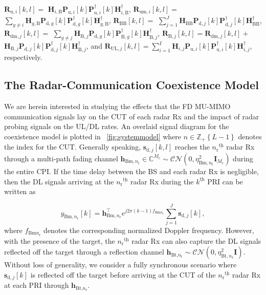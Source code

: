 \documentclass[9pt,journal]{IEEEtran}
\newcommand{\paren}[1]{\left({#1}\right)}
\newcommand{\bracket}[1]{{\left [{#1}\right ]}}
\newcommand{\braces}[1]{{\left\{ {#1}\right\}}}
\newcommand{\ith}[1]    {{#1}^{\underline{\text{th}}}}
\newcommand{\rr}{_\mathrm{r}}
\newcommand{\B}{\textrm{B}}
\newcommand{\PiB}{\mathbf{P}_{\textrm{u},i}\bracket{k}}
\newcommand{\PiBH}{\mathbf{P}^\dagger_{\textrm{u},i}\bracket{k}}
\newcommand{\PBj}{\mathbf{P}_{\textrm{d},j}\bracket{k}}
\newcommand{\PBjH}{\mathbf{P}^\dagger_{\textrm{d},j}\bracket{k}}
\newcommand{\PBg}{\mathbf{P}_{\textrm{d},g}\bracket{k}}
\newcommand{\PBgH}{\mathbf{P}^\dagger_{\textrm{d},g}\bracket{k}}
\newcommand{\HiB}{\mathbf{H}_{i,\textrm{B}}}
\newcommand{\HiBH}{\mathbf{H}^\dagger_{i,\textrm{B}}}
\begin{document}
$\mathbf{R}_{\textrm{u},i}\bracket{k,l}=$ $\HiB\PiB\PiBH\HiBH$,  $\mathbf{R}_{\textrm{um},i}\bracket{k,l}=$ $\sum_{g\neq i }\mathbf{H}_{g,\textrm{B}}\PBg\PBgH\mathbf{H}^\dagger_{g,\textrm{B}}$, $\mathbf{R}_{\mathrm{BB}}\bracket{k,l}=$ $\sum_{j=1}^{\mathit{J}}\mathbf{H}_{\mathrm{BB}}\PBj\PBjH\mathbf{H}^\dagger_\mathrm{BB}$, $\mathbf{R}_{\textrm{dm},j}\bracket{k,l}=$ $\sum_{g\neq j}\mathbf{H}_{\textrm{B},j}\PBg\mathbf{P}^{\dagger}_{\textrm{B},g}\bracket{k}\mathbf{H}^\dagger_{\textrm{B},j}$, $\mathbf{R}_{\B,j}\bracket{k,l}=\mathbf{R}_{\textrm{dm},j}\bracket{k,l}+$ $\mathbf{H}_{\textrm{B},j}\PBj\PBjH\mathbf{H}^\dagger_{\textrm{B},j}$, and $\mathbf{R}_{\mathrm{UL},j}\bracket{k,l}=\sum_{i=1}^{\mathit{I}}\mathbf{H}_{i,j}\PiB\PiBH\mathbf{H}^\dagger_{i,j}$, respectively. 
\fi

\subsection{The Radar-Communication Coexistence Model}\label{Coexistence}
We are herein interested in studying the effects that the FD MU-MIMO communication signals lay on the CUT of each radar Rx and the impact of radar probing signals on the UL/DL rates. An overlaid signal diagram for the coexistence model is plotted in \figurename{~\ref{fig:systemmodel}} where $n\in\mathbb{Z}_+\braces{\mathit{L}-1}$ denotes the index for the CUT.  Generally speaking, $\mathbf{s}_{\textrm{d},j}\bracket{k,l}$ reaches the $\ith{n\rr}$ radar Rx through a multi-path fading channel $\mathbf{h}_{\mathrm{Bm},n\rr}\in\mathbb{C}^{\mathit{M}_\mathrm{c}}\sim \mathcal{CN}\paren{0,\eta^2_{\textrm{Bm},n\rr}\mathbf{I}_{\mathit{M}_\mathrm{c}}}$ during the entire CPI. If the time delay between the BS and each radar Rx is negligible, then the DL signals arriving at the $\ith{n\rr}$ radar Rx during the $
\ith{k}$ PRI can be written as \par\noindent\small
\begin{equation*}
y_{\mathrm{Bm},n\rr}\bracket{k}=\mathbf{h}_{\mathrm{Bm},n\rr}^\top e^{j2\pi\paren{k-1} f_{\mathrm{Bm}n_\mathrm{r}}}
\sum_{j=1}^\mathit{J}\mathbf{s}_{\textrm{d},j}\bracket{k},
\end{equation*}\normalsize
where $f_{\mathrm{Bm}n_\mathrm{r}}$ denotes the corresponding normalized Doppler frequency.  
However, with the presence of the target, the $\ith{n\rr}$ radar Rx can also capture the DL signals reflected off the target through a reflection channel $\mathbf{h}_{\textrm{Bt,}n\rr}\sim\mathcal{CN}\paren{0,\eta^2_{\textrm{Bt},n\rr}\mathbf{I}}$. Without loss of generality, we consider a fully synchronous scenario where $\mathbf{s}_{\textrm{d},j}\bracket{k}$ is reflected off the target before arriving at the CUT of the $\ith{n\rr}$ radar Rx at each PRI through $\mathbf{h}_{\textrm{Bt,}n\rr}$.
\end{document}
